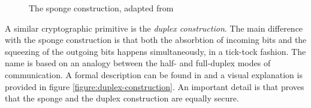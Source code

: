 \begin{figure}
  \caption{The sponge construction, adapted from \cite{bertoni:2011:duplexing,marcos:2015:lyra2}}
  \label{figure:sponge-construction}
\end{figure}

A similar cryptographic primitive is the \emph{duplex construction}. The main difference with the sponge construction is that both the absorbtion of incoming bits and the squeezing of the outgoing bits happens simultaneously, in a tick-tock fashion. The name is based on an analogy between the half- and full-duplex modes of communication. A formal description can be found in \cite{bertoni:2011:duplexing} and a visual explanation is provided in figure \ref{figure:duplex-construction}. An important detail is that \cite{bertoni:2011:duplexing} proves that the sponge and the duplex construction are equally secure.

